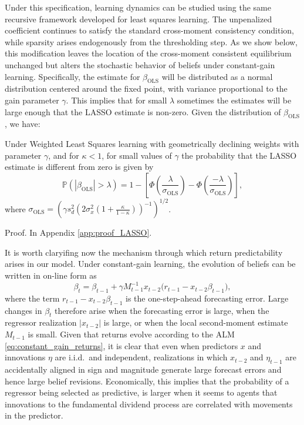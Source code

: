 \documentclass[11pt]{article}
\begin{document}
Under this specification, learning dynamics can be studied using the same recursive framework developed for least squares learning. The unpenalized coefficient continues to satisfy the standard cross-moment consistency condition, while sparsity arises endogenously from the thresholding step. As we show below, this modification leaves the location of the cross-moment consistent equilibrium unchanged but alters the stochastic behavior of beliefs under constant-gain learning.
Specifically, the estimate for $\beta_{\text{OLS}}$ will be distributed as a normal distribution centered around the fixed point, with variance proportional to the gain parameter $\gamma$. 
This implies that for small $\lambda$ sometimes the estimates will be large enough that the LASSO estimate is non-zero. 
Given the distribution of $\beta_{\text{OLS}}$, we have: 
\begin{proposition}\label{prop:LASSO_estimate}
     Under Weighted Least Squares learning with geometrically declining weights with parameter $\gamma$, and for $\kappa < 1$, for small values of $\gamma$ the probability that the LASSO estimate is different from zero is given by 
     \begin{equation} \mathbb{P}(|{\beta}_{\text{OLS}}| > \lambda) = 1 - \left[\Phi\left(\frac{\lambda}{\sigma_{\text{OLS}}}\right) - \Phi\left(\frac{-\lambda}{\sigma_{\text{OLS}}}\right)\right], \end{equation} where $\sigma_{\text{OLS}} = \left(\gamma s_{d}^2 \left(2 \sigma^2_x \left(1 + \frac{\kappa}{1 - \kappa} \right)\right)^{-1}\right)^{1/2}$.
\end{proposition}

Proof. In Appendix \ref{app:proof_LASSO}.

It is worth claryifing now the mechanism through which return predictability arises in our model.
Under constant-gain learning, the evolution of beliefs can be written in on-line form as
\begin{equation}
\beta_t
=
\beta_{t-1}
+
\gamma M_{t-1}^{-1} x_{t-2}
\bigl(r_{t-1} - x_{t-2}\beta_{t-1}\bigr),
\end{equation}
where the term $r_{t-1} - x_{t-2}\beta_{t-1}$ is the one-step-ahead forecasting error.
Large changes in $\beta_t$ therefore arise when the forecasting error is large, when the regressor realization $|x_{t-2}|$ is large, or when the local second-moment estimate $M_{t-1}$ is small.
Given that returns evolve according to the ALM \eqref{eq:constant_gain_returns}, it is clear that 
even when predictors $x$ and innovations $\eta$ are i.i.d.\ and independent, realizations in which $x_{t-2}$ and $\eta_{t-1}$ are accidentally aligned in sign and magnitude generate large forecast errors and hence large belief revisions.
Economically, this implies that the probability of a regressor being selected as predictive, is larger when it seems to agents that innovations to the fundamental dividend process are correlated with movements in the predictor.
\end{document}
